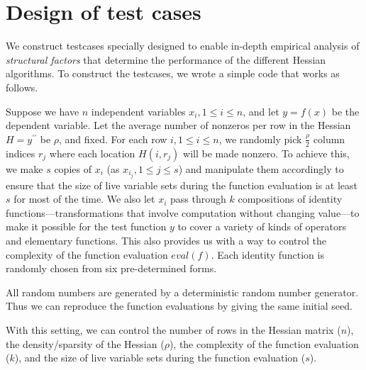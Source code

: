 \documentclass[10pt, a4paper, english]{article}
\begin{document}
\section*{Design of test cases}

We construct testcases specially designed to enable in-depth empirical analysis of {\em structural factors} that determine the performance of the  different Hessian algorithms. 
To construct the testcases, we wrote a simple code that works as follows. 

Suppose we have $n$ independent variables $x_i, 1 \le i \le n$, and let $y = f(x)$ be the dependent variable. Let the average number of nonzeros per row in the Hessian $H = y^{\prime\prime}$ be $\rho$, and fixed. 
For each row $i, 1 \le i \le n$, we randomly pick $\frac{\rho}{2}$ column indices $r_j$ where each location $H(i, r_j)$ will be made nonzero. 
To achieve this, we make $s$ copies of $x_i$ (as $x_{i_j}, 1 \le j \le s$) and manipulate them accordingly to ensure that the size of live variable sets during the function evaluation is at least $s$ for most of the time. We also let $x_i$ pass through $k$ compositions of identity functions---transformations that involve computation without changing value---to make it possible for the test function $y$ to cover a variety of kinds of operators and elementary functions. This also provides us with a way to control the complexity of the function evaluation $eval(f)$. Each identity function is randomly chosen from six pre-determined forms. 

All random numbers are generated by a deterministic random number generator. Thus we can reproduce the function evaluations by giving the same initial seed.

With this setting, we can control the number of rows in the Hessian matrix ($n$), the density/sparsity of the Hessian ($\rho$), the complexity of the function evaluation ($k$), and the size of live variable sets during the function evaluation ($s$).
\end{document}
